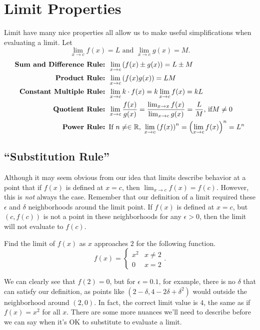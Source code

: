 \section{Limit Properties}
Limit have many nice properties all allow us to make useful simplifications when evaluating a limit.
Let
\begin{equation*}
	\lim_{x \to c}{f(x)} = L \text{ and } \lim_{x \to c}{g(x)} = M.
\end{equation*}
\begin{align*}
	\textbf{Sum and Difference Rule: }& \lim_{x\to c}{\left(f(x) \pm g(x)\right)} = L \pm M \\
	\textbf{Product Rule: }& \lim_{x\to c}{\left(f(x)g(x) \right)} = LM \\
	\textbf{Constant Multiple Rule: }& \lim_{x \to c}{k\cdot f(x)} = k \lim_{x \to c}{f(x)} = kL \\
	\textbf{Quotient Rule: }& \lim_{x \to c}{\frac{f(x)}{g(x)}} = \frac{\lim_{x \to x}{f(x)}}{\lim_{x \to c}{g(x)}} = \frac{L}{M} \text{, if} M \neq 0 \\
	\textbf{Power Rule: }& \text{If } n \neq  \in \mathbb{R} \text{, } \lim_{x\to c}{\left(f(x)\right)^n} = \left(\lim_{x \to c}{f(x)}\right)^n = L^n
\end{align*}

\subsection{``Substitution Rule''}
Although it may seem obvious from our idea that limits describe behavior at a point that if $f(x)$ is defined at $x=c$, then $\lim_{x\to c}{f(x)} = f(c)$.
However, this is \textit{not} always the case.
Remember that our definition of a limit required these $\epsilon$ and $\delta$ neighborhoods around the limit point.
If $f(x)$ is defined at $x=c$, but $(c, f(c))$ is not a point in these neighborhoods for any $\epsilon > 0$, then the limit will not evaluate to $f(c)$.

\begin{example}
	Find the limit of $f(x)$ as $x$ approaches $2$ for the following function.
	\begin{equation*}
		f(x) = \begin{cases}
			x^2 & x \neq 2 \\
			0 & x = 2
		\end{cases}.
	\end{equation*}
\end{example}
\begin{answer}
	We can clearly see that $f(2) =  0$, but for $\epsilon = 0.1$, for example, there is no $\delta$ that can satisfy our definition, as points like $(2 - \delta, 4 - 2\delta + \delta^2)$ would outside the neighborhood around $(2,0)$.
	In fact, the correct limit value is $4$, the same as if $f(x) = x^2$ for all $x$.
	There are some more nuances we'll need to describe before we can say when it's OK to substitute to evaluate a limit.
\end{answer}